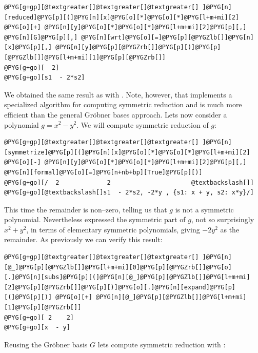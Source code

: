 \begin{Verbatim}[commandchars=@\[\]]
@PYG[g+gp][@textgreater[]@textgreater[]@textgreater[] ]@PYG[n][reduced]@PYG[p][(]@PYG[n][x]@PYG[o][*]@PYG[o][*]@PYG[l+m+mi][2] @PYG[o][+] @PYG[n][y]@PYG[o][*]@PYG[o][*]@PYG[l+m+mi][2]@PYG[p][,] @PYG[n][G]@PYG[p][,] @PYG[n][wrt]@PYG[o][=]@PYG[p][@PYGZlb[]]@PYG[n][x]@PYG[p][,] @PYG[n][y]@PYG[p][@PYGZrb[]]@PYG[p][)]@PYG[p][@PYGZlb[]]@PYG[l+m+mi][1]@PYG[p][@PYGZrb[]]
@PYG[g+go][  2]
@PYG[g+go][s1  - 2*s2]
\end{Verbatim}
\noindent
We obtained the same result as with . Note, however, that  implements
a specialized algorithm for computing symmetric reduction \cite{PlanetMathSymmetric} and is much more efficient
than the general Gröbner bases approach. Lets now consider a polynomial $g = x^2 - y^2$. We will compute
symmetric reduction of $g$:

\begin{Verbatim}[commandchars=@\[\]]
@PYG[g+gp][@textgreater[]@textgreater[]@textgreater[] ]@PYG[n][symmetrize]@PYG[p][(]@PYG[n][x]@PYG[o][*]@PYG[o][*]@PYG[l+m+mi][2] @PYG[o][-] @PYG[n][y]@PYG[o][*]@PYG[o][*]@PYG[l+m+mi][2]@PYG[p][,] @PYG[n][formal]@PYG[o][=]@PYG[n+nb+bp][True]@PYG[p][)]
@PYG[g+go][/  2             2                      @textbackslash[]]
@PYG[g+go][@textbackslash[]s1  - 2*s2, -2*y , {s1: x + y, s2: x*y}/]
\end{Verbatim}
\noindent
This time the remainder is non--zero, telling us that $g$ is not a symmetric polynomial. Nevertheless
 expressed the symmetric part of $g$, not so surprisingly $x^2 + y^2$, in terms of
elementary symmetric polynomials, giving $-2 y^2$ as the remainder. As previously we can verify this
result:

\begin{Verbatim}[commandchars=@\[\]]
@PYG[g+gp][@textgreater[]@textgreater[]@textgreater[] ]@PYG[n][@_]@PYG[p][@PYGZlb[]]@PYG[l+m+mi][0]@PYG[p][@PYGZrb[]]@PYG[o][.]@PYG[n][subs]@PYG[p][(]@PYG[n][@_]@PYG[p][@PYGZlb[]]@PYG[l+m+mi][2]@PYG[p][@PYGZrb[]]@PYG[p][)]@PYG[o][.]@PYG[n][expand]@PYG[p][(]@PYG[p][)] @PYG[o][+] @PYG[n][@_]@PYG[p][@PYGZlb[]]@PYG[l+m+mi][1]@PYG[p][@PYGZrb[]]
@PYG[g+go][ 2    2]
@PYG[g+go][x  - y]
\end{Verbatim}
\noindent
Reusing the Gröbner basis $G$ lets compute symmetric reduction with :


